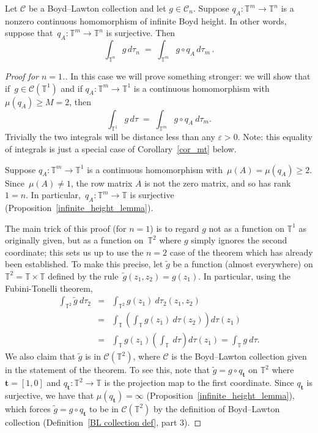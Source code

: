 \documentclass[10pt,a4paper]{amsart}
\newcommand{\mb}{\mathbf}
\newcommand{\mc}{\mathcal}
\newcommand{\torus}{{\mathbb{T}}}
\begin{document}
\begin{corollary}  \label{cor_mt}
Let $\mc C$ be a Boyd--Lawton collection and let $g \in \mc C_n$.
Suppose $q_A \colon \torus^m \to \torus^n$ is a nonzero continuous homomorphism of infinite Boyd height. In other words, suppose 
that~$q_A \colon \torus^m \to \torus^n$ is surjective.
Then
$$
 \int_{\torus^{n}} g \, d \tau_{n}
 \;  = \; 
\int_{\torus^m} g \circ q_A \, d \tau_m \,.
$$
\end{corollary}

\begin{proof}[Proof for $n=1$.]
In this case we will prove something stronger: we will show that if~$g\in \mc C(\torus^1)$ and if 
$q_A \colon \torus^m \to \torus^1$ is a continuous homomorphism with $\mu\left(q_A\right) \ge M = 2$,
then
$$
 \int_{\torus^{1}} g \, d \tau
 \;  = \; 
\int_{\torus^{m}} g \circ q_{A} \ d \tau_{m}.
$$
Trivially the two integrals will be distance less than any $\varepsilon>0$.  Note: this equality of integrals is just a special case of Corollary~\ref{cor_mt} below.

Suppose $q_A \colon \torus^m \to \torus^1$ is a continuous homomorphism with~$\mu(A) = \mu\left(q_A\right) \ge 2$. Since~$\mu(A) \ne 1$, the row matrix $A$ is not the zero matrix, and so has rank $1=n$.
In particular,~$q_A \colon \torus^m \to \torus$ is surjective (Proposition~\ref{infinite_height_lemma}).

The main trick of this proof (for $n=1$) is to regard $g$ not as a function on $\torus^1$ as originally given, but as a function on~$\torus^2$ where $g$  simply ignores the second coordinate;
this sets us up to use the $n = 2$ case of the theorem which has already been established.
To make this precise, let $\tilde g$ be a function (almost everywhere) on $\torus^2= \torus \times \torus$
defined by the rule~$\tilde g(z_1, z_2) = g(z_1)$. 
In particular, using the Fubini-Tonelli theorem,
\begin{eqnarray*}
\int_{\torus^2} \tilde g \ d\tau_2 
&=& \int_{\torus^2} g (z_1) \ d\tau_2(z_1, z_2) \\
&=& \int_{\torus} \left( \int_{\torus} g(z_1) \ d\tau(z_2) \right) d\tau  (z_1) \\
&=& \int_{\torus}  g(z_1) \left( \int_{\torus}  \ d\tau \right) d\tau  (z_1)   = \int_{\torus} g \ d\tau.
\end{eqnarray*}
We also claim that $\tilde g$ is in $\mc C(\torus^2)$, where $\mc C$ is the  Boyd--Lawton collection given in the statement of the theorem.
To see this, note that  $\tilde g = g\circ q_{\mb t}$ on $\torus^2$ where $\mb t = [1, 0]$ and $q_{\mb t} \colon \torus^2 \to \torus$ is the projection map to the first coordinate. Since $q_{\mb t}$ is surjective, we have 
that $\mu \left(q_{\mb t}\right) = \infty$ (Proposition~\ref{infinite_height_lemma}), which forces $\tilde g= g\circ q_{\mb t}$ to be in $\mc C(\torus^2)$ by the definition of Boyd--Lawton collection (Definition~\ref{BL collection def}, part 3).



\end{proof}
\end{document}
